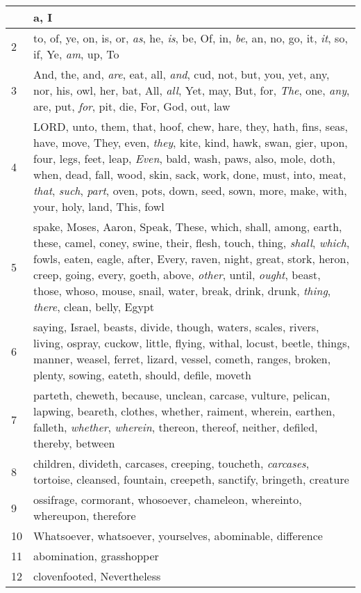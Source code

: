 \begin{longtable}{l|p{3.75in}}
\hline \hline
\endlastfoot
1 & a, I \\ \hline
2 & to, of, ye, on, is, or, \emph{as}, he, \emph{is}, be, Of, in, \emph{be}, an, no, go, it, \emph{it}, so, if, Ye, \emph{am}, up, To \\ \hline
3 & And, the, and, \emph{are}, eat, all, \emph{and}, cud, not, but, you, yet, any, nor, his, owl, her, bat, All, \emph{all}, Yet, may, But, for, \emph{The}, one, \emph{any}, are, put, \emph{for}, pit, die, For, God, out, law \\ \hline
4 & LORD, unto, them, that, hoof, chew, hare, they, hath, fins, seas, have, move, They, even, \emph{they}, kite, kind, hawk, swan, gier, upon, four, legs, feet, leap, \emph{Even}, bald, wash, paws, also, mole, doth, when, dead, fall, wood, skin, sack, work, done, must, into, meat, \emph{that}, \emph{such}, \emph{part}, oven, pots, down, seed, sown, more, make, with, your, holy, land, This, fowl \\ \hline
5 & spake, Moses, Aaron, Speak, These, which, shall, among, earth, these, camel, coney, swine, their, flesh, touch, thing, \emph{shall}, \emph{which}, fowls, eaten, eagle, after, Every, raven, night, great, stork, heron, creep, going, every, goeth, above, \emph{other}, until, \emph{ought}, beast, those, whoso, mouse, snail, water, break, drink, drunk, \emph{thing}, \emph{there}, clean, belly, Egypt \\ \hline
6 & saying, Israel, beasts, divide, though, waters, scales, rivers, living, ospray, cuckow, little, flying, withal, locust, beetle, things, manner, weasel, ferret, lizard, vessel, cometh, ranges, broken, plenty, sowing, eateth, should, defile, moveth \\ \hline
7 & parteth, cheweth, because, unclean, carcase, vulture, pelican, lapwing, beareth, clothes, whether, raiment, wherein, earthen, falleth, \emph{whether}, \emph{wherein}, thereon, thereof, neither, defiled, thereby, between \\ \hline
8 & children, divideth, carcases, creeping, toucheth, \emph{carcases}, tortoise, cleansed, fountain, creepeth, sanctify, bringeth, creature \\ \hline
9 & ossifrage, cormorant, whosoever, chameleon, whereinto, whereupon, therefore \\ \hline
10 & Whatsoever, whatsoever, yourselves, abominable, difference \\ \hline
11 & abomination, grasshopper \\ \hline
12 & clovenfooted, Nevertheless \\ \hline
\end{longtable}






